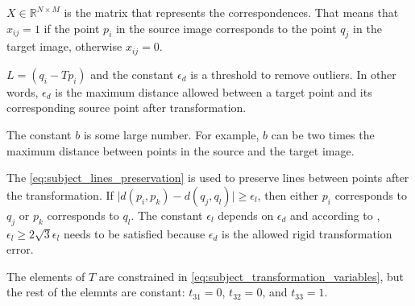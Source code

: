        $X \in \mathbb{R}^{N \times M}$ is the matrix that represents the correspondences.
        That means that $x_{ij} = 1$ if the point $p_i$ in the source image corresponds to the point $q_j$ in the target image, otherwise $x_{ij} = 0$.

        $L = (q_i - T p_i)$ and the constant $\epsilon_d$ is a threshold to remove outliers. 
        In other words, $\epsilon_d$ is the maximum distance allowed between a target point and its corresponding source point after transformation.

        The constant $b$ is some large number. For example, $b$ can be two times the maximum distance between points in the source and the target image.

        The \autoref{eq:subject_lines_preservation} is used to preserve lines between points after the transformation.
        If $\mid d(p_i, p_k) - d(q_j, q_l) \mid \geq \epsilon_l$, then either $p_i$ corresponds to $q_j$ or $p_k$ corresponds to $q_l$.
        The constant $\epsilon_l$ depends on $\epsilon_d$ and according to \cite{Sakakubara_2007_automatic}, 
        $\epsilon_l \geq 2 \sqrt{3} \epsilon_l$ needs to be satisfied because $\epsilon_d$ is the allowed rigid transformation error.

        The elements of $T$ are constrained in \autoref{eq:subject_transformation_variables},
        but the rest of the elemnts are constant: $t_{31} = 0$, $t_{32} = 0$, and $t_{33} = 1$.
        
          

